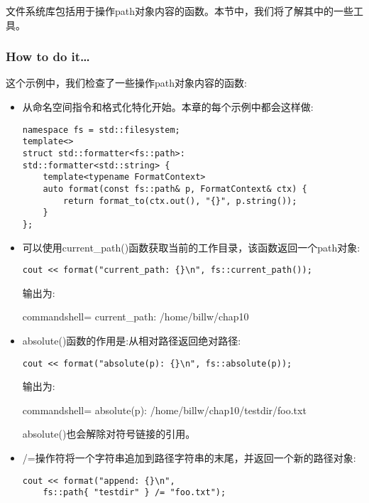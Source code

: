 
文件系统库包括用于操作path对象内容的函数。本节中，我们将了解其中的一些工具。

\subsubsection{How to do it…}

这个示例中，我们检查了一些操作path对象内容的函数:

\begin{itemize}
\item 
从命名空间指令和格式化特化开始。本章的每个示例中都会这样做:

\begin{lstlisting}[style=styleCXX]
namespace fs = std::filesystem;
template<>
struct std::formatter<fs::path>:
std::formatter<std::string> {
	template<typename FormatContext>
	auto format(const fs::path& p, FormatContext& ctx) {
		return format_to(ctx.out(), "{}", p.string());
	}
};
\end{lstlisting}

\item 
可以使用current\_path()函数获取当前的工作目录，该函数返回一个path对象:

\begin{lstlisting}[style=styleCXX]
cout << format("current_path: {}\n", fs::current_path());
\end{lstlisting}

输出为:

\begin{tcblisting}{commandshell={}}
current_path: /home/billw/chap10
\end{tcblisting}

\item 
absolute()函数的作用是:从相对路径返回绝对路径:

\begin{lstlisting}[style=styleCXX]
cout << format("absolute(p): {}\n", fs::absolute(p));
\end{lstlisting}

输出为:

\begin{tcblisting}{commandshell={}}
absolute(p): /home/billw/chap10/testdir/foo.txt
\end{tcblisting}

absolute()也会解除对符号链接的引用。

\item 
/=操作符将一个字符串追加到路径字符串的末尾，并返回一个新的路径对象:

\begin{lstlisting}[style=styleCXX]
cout << format("append: {}\n",
	fs::path{ "testdir" } /= "foo.txt");
\end{lstlisting}


\end{itemize}

